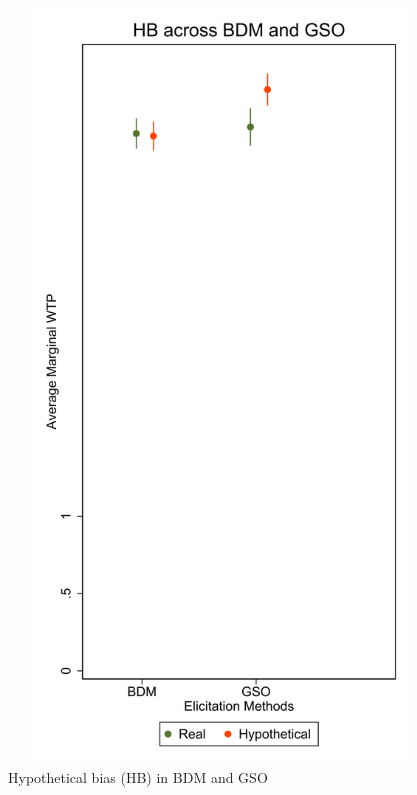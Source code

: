 \documentclass[12pt]{article}
\begin{document}
\begin{figure}[H]
    \centering
  \includegraphics[width=15cm, height=20cm]{Model50.pdf}
    \caption{ Hypothetical bias (HB) in BDM and GSO}
    \label{fig:margin_hypo}
\end{figure}
\end{document}

